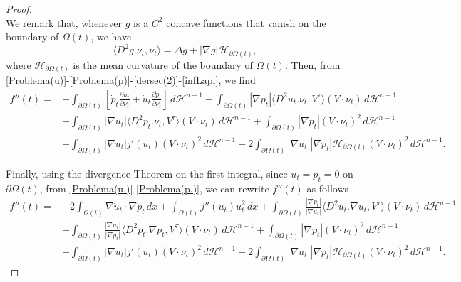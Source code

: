 \documentclass[oneside,a4paper,11pt,notitlepage]{article}
\newcommand{\abs}[1]{{\left|#1\right|}}
\theoremstyle{definition}
\theoremstyle{plain}
\theoremstyle{definition}
\begin{document}
\begin{proof}
\begin{equation}
\end{equation}
We remark that, whenever $g$ is a $C^2$ concave functions that vanish on the boundary of $\Omega(t)$, we have
\begin{equation}\label{infLapl}
    \langle D^2g.\nu_t,\nu_t\rangle=\Delta g+\abs{\nabla g}\mathscr{H}_{\partial\Omega(t)},
\end{equation}
where $\mathscr{H}_{\partial\Omega(t)}$ is the mean curvature of the boundary of $\Omega(t)$. Then, from \eqref{Problema(u)}-\eqref{Problema(p)}-\eqref{dersec(2)}-\eqref{infLapl}, we find
\begin{equation*}
    \begin{split}
        f''(t)=&-\int_{\partial\Omega(t)}\left[\dot{p}_t\frac{\partial\dot{u}_t}{\partial\nu_t}+\dot{u}_t\frac{\partial\dot{p}_t}{\partial\nu_t} \right]\,d\mathcal{H}^{n-1}-\int_{\partial\Omega(t)}\abs{\nabla p_t}\langle D^2u_t.\nu_t,V^\tau\rangle(V\cdot\nu_t)\,d\mathcal{H}^{n-1}\\
        &-\int_{\partial\Omega(t)}\abs{\nabla u_t}\langle D^2p_t.\nu_t,V^\tau\rangle(V\cdot\nu_t)\,d\mathcal{H}^{n-1}+\int_{\partial\Omega(t)}\abs{\nabla p_t}(V\cdot\nu_t)^2\,d\mathcal{H}^{n-1}\\
        &+\int_{\partial\Omega(t)}\abs{\nabla u_t}j'(u_t)(V\cdot\nu_t)^2\,d\mathcal{H}^{n-1}-2\int_{\partial\Omega(t)}\abs{\nabla u_t}\abs{\nabla p_t}\mathscr{H}_{\partial\Omega(t)}(V\cdot\nu_t)^2\,d\mathcal{H}^{n-1}.
    \end{split}
\end{equation*}

Finally, using the divergence Theorem on the first integral, since $u_t=p_t=0$ on $\partial\Omega(t)$, from \eqref{Problema(u.)}-\eqref{Problema(p.)}, we can rewrite $f''(t)$ as follows
\begin{equation*}
    \begin{split}
        f''(t)=&-2\int_{\Omega(t)}\nabla \dot{u}_t\cdot\nabla\dot{p}_t \,dx+\int_{\Omega(t)}j''(u_t)\dot{u}_t^2\,dx+\int_{\partial\Omega(t)}\frac{\abs{\nabla p_t}}{\abs{\nabla u_t}}\langle D^2u_t.\nabla u_t,V^\tau\rangle(V\cdot\nu_t)\,d\mathcal{H}^{n-1}\\
        &+\int_{\partial\Omega(t)}\frac{\abs{\nabla u_t}}{\abs{\nabla p_t}}\langle D^2p_t.\nabla p_t,V^\tau\rangle(V\cdot\nu_t)\,d\mathcal{H}^{n-1}+\int_{\partial\Omega(t)}\abs{\nabla p_t}(V\cdot\nu_t)^2\,d\mathcal{H}^{n-1}\\
        &+\int_{\partial\Omega(t)}\abs{\nabla u_t}j'(u_t)(V\cdot\nu_t)^2\,d\mathcal{H}^{n-1}-2\int_{\partial\Omega(t)}\abs{\nabla u_t}\abs{\nabla p_t}\mathscr{H}_{\partial\Omega(t)}(V\cdot\nu_t)^2\,d\mathcal{H}^{n-1}.
    \end{split}
\end{equation*}
\end{proof}
\end{document}
